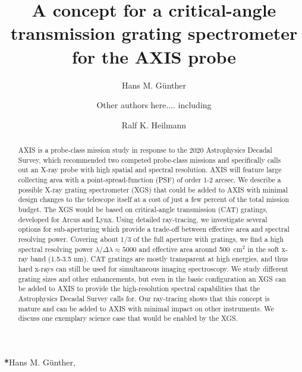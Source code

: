 \documentclass[12pt]{spieman}  %
\title{A concept for a critical-angle transmission grating spectrometer for the AXIS probe}
\author[a]{Hans M. G\"unther}
\author[a]{Other authors here.... including}
\author[a,b]{Ralf K. Heilmann}
\affil[a]{MIT Kavli Institute for Astrophysics and Space Research, Massachusetts Institute of Technology, Cambridge, MA 02139, USA}
\affil[b]{Space Nanotechnology Laboratory, Massachusetts Institute of Technology, Cambridge, MA 02139, USA}
\begin{document}
\maketitle

\begin{abstract}
AXIS is a probe-class mission study in response to the 2020 Astrophysics Decadal Survey, which recommended two competed probe-class missions and specifically calls out an X-ray probe with high spatial and spectral resolution. AXIS will feature large collecting area with a point-spread-function (PSF) of order 1-2 arcsec. We describe a possible X-ray grating spectrometer (XGS) that could be added to AXIS with minimal design changes to the telescope itself at a cost of just a few percent of the total mission budget. The XGS would be based on critical-angle transmission (CAT) gratings, developed for Arcus and Lynx. Using detailed ray-tracing, we investigate several options for sub-aperturing which provide a trade-off between effective area and spectral resolving power. Covering about 1/3 of the full aperture with gratings, we find a  high spectral resolving power $\lambda/\Delta\lambda \approx 5000$ and effective area around 500~cm$^2$ in the soft x-ray band (1.5-3.5 nm). CAT gratings are mostly transparent at high energies, and thus hard x-rays can still be used for simultaneous imaging spectroscopy. We study different grating sizes and other enhancements, but even in the basic configuration an XGS can be added to AXIS to provide the high-resolution spectral capabilities that the  Astrophysics Decadal Survey calls for. Our ray-tracing shows that this concept is mature and can be added to AXIS with minimal impact on other instruments. We discuss one exemplary science case that would be enabled by the XGS.

\end{abstract}


{\noindent \footnotesize\textbf{*}Hans M. G\"unther,   }
\end{document}
